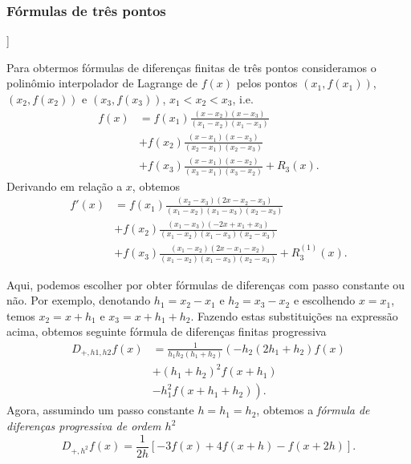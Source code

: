 \subsubsection{Fórmulas de três pontos}

\begin{flushleft}
  [[tag:revisar]]
\end{flushleft}

Para obtermos fórmulas de diferenças finitas de três pontos consideramos o polinômio interpolador de Lagrange de $f(x)$ pelos pontos $(x_1, f(x_1))$, $(x_2, f(x_2))$ e $(x_3, f(x_3))$, $x_1<x_2<x_3$, i.e.
\begin{align}
  f(x) &= f(x_1)\frac{(x-x_2)(x-x_3)}{(x_1-x_2)(x_1-x_3)} \\
  &+ f(x_2)\frac{(x-x_1)(x-x_3)}{(x_2-x_1)(x_2-x_3)} \\
  &+ f(x_3)\frac{(x-x_1)(x-x_2)}{(x_3-x_1)(x_3-x_2)} + R_3(x).
\end{align}
Derivando em relação a $x$, obtemos
\begin{align}\label{eq:aux_deriv1}
  f'(x) &= f{\left (x_{1} \right )}\frac{\left(x_{2} - x_{3}\right) \left(2 x- x_{2} - x_{3}\right)}{\left(x_{1} - x_{2}\right) \left(x_{1} - x_{3}\right) \left(x_{2} - x_{3}\right)} \\
  &+ f{\left (x_{2} \right )}\frac{\left(x_{1} - x_{3}\right) \left(- 2 x + x_{1} + x_{3}\right)}{\left(x_{1} - x_{2}\right) \left(x_{1} - x_{3}\right) \left(x_{2} - x_{3}\right)}\\
  &+ f\left(x_{3} \right)\frac{\left(x_{1} - x_{2}\right)\left(2 x - x_{1} - x_{2}\right)}{\left(x_{1} - x_{2}\right) \left(x_{1} - x_{3}\right) \left(x_{2} - x_{3}\right)} + R_3^{(1)}(x).
\end{align}

Aqui, podemos escolher por obter fórmulas de diferenças com passo constante ou não. Por exemplo, denotando $h_1=x_2-x_1$ e $h_2=x_3-x_2$ e escolhendo $x=x_1$, temos $x_2 = x+h_1$ e $x_3 = x+h_1+h_2$. Fazendo estas substituições na expressão acima, obtemos seguinte fórmula de diferenças finitas progressiva
\begin{align}
  D_{+,h1,h2}f(x) &= \frac{1}{h_{1} h_{2} \left(h_{1} + h_{2}\right)} \left(- h_{2} \left(2 h_{1} + h_{2}\right) f{\left (x \right )} \right.\\
    &+ \left. \left(h_{1} + h_{2}\right)^{2} f{\left (x + h_{1} \right )} \right.\\
    &- \left. h_{1}^{2} f{\left (x + h_{1} + h_{2} \right )} \right).
\end{align}
Agora, assumindo um passo constante $h=h_1=h_2$, obtemos a \emph{fórmula de diferenças progressiva de ordem $h^2$}
\begin{equation}
  D_{+,h^2}f(x) = \frac{1}{2 h} \left[- 3 f{\left (x \right )} + 4 f{\left (x + h \right )} - f{\left (x + 2 h \right )}\right].\label{eq:dfp_3pts}
\end{equation}

